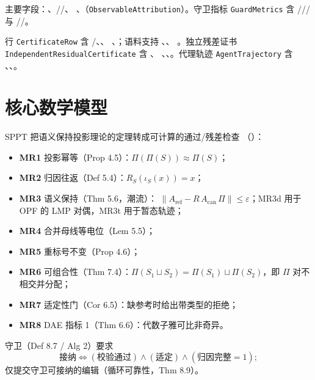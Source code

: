\documentclass[UTF8,fontset=fandol,a4paper,11pt]{ctexart}
\begin{document}
主要字段：、//、
、（\texttt{ObservableAttribution}）。守卫指标 \texttt{GuardMetrics} 含
/// 与 //。

行 \texttt{CertificateRow} 含 /、、
、；语料支持 、、
。独立残差证书 \texttt{IndependentResidualCertificate} 含 、
、、。代理轨迹
\texttt{AgentTrajectory} 含 、、。

\section{核心数学模型}
SPPT 把语义保持投影理论的定理转成可计算的通过/残差检查
（）：

\begin{itemize}
  \item \textbf{MR1} 投影幂等（Prop 4.5）：$\Pi(\Pi(S)) \approx \Pi(S)$；
  \item \textbf{MR2} 归因往返（Def 5.4）：$R_S(\iota_S(x)) = x$；
  \item \textbf{MR3} 语义保持（Thm 5.6，潮流）：
        $\lVert A_{\text{ref}} - R\,A_{\text{can}}\,\Pi \rVert \le \varepsilon$；MR3d 用于 OPF 的
        LMP 对偶，MR3t 用于暂态轨迹；
  \item \textbf{MR4} 合并母线等电位（Lem 5.5）；
  \item \textbf{MR5} 重标号不变（Prop 4.6）；
  \item \textbf{MR6} 可组合性（Thm 7.4）：$\Pi(S_1 \sqcup S_2) = \Pi(S_1) \sqcup \Pi(S_2)$，即
        $\Pi$ 对不相交并分配；
  \item \textbf{MR7} 适定性门（Cor 6.5）：缺参考时给出带类型的拒绝；
  \item \textbf{MR8} DAE 指标 1（Thm 6.6）：代数子雅可比非奇异。
\end{itemize}

守卫（Def 8.7 / Alg 2）要求
\begin{equation}
\text{接纳} \iff (\text{校验通过}) \wedge (\text{适定}) \wedge (\text{归因完整}=1);
\end{equation}
 仅提交守卫可接纳的编辑（循环可靠性，Thm 8.9）。
\end{document}
